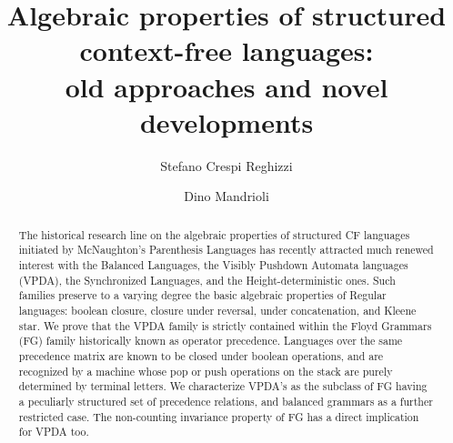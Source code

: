 \documentclass[3p,11pt]{elsarticle}
\begin{document}
\begin{frontmatter}

\title{Algebraic properties of structured context-free languages:\\ old approaches and novel developments}

\author[Milano]{Stefano Crespi Reghizzi}
\author[Milano]{Dino Mandrioli}
\address[Milano]{DEI - Politecnico di Milano, 
Piazza Leonardo da Vinci 32, \\
I-20133 Milano, Italy\\
e-mail: \{stefano.crespireghizzi, dino.mandrioli\}@polimi.it}



\begin{abstract}
The historical research line on the algebraic properties of structured CF languages initiated by McNaughton's Parenthesis Languages has recently attracted much renewed interest with the Balanced Languages, the Visibly Pushdown Automata languages (VPDA), the Synchronized Languages, and the Height-deterministic ones. Such families preserve to a varying degree the basic algebraic properties of Regular languages: boolean closure, closure under reversal, under concatenation, and Kleene star. We prove that the VPDA family is strictly contained within the Floyd Grammars (FG) family historically known as operator precedence. Languages over the same precedence matrix are known to be closed under boolean operations, and are recognized by a machine whose pop or push operations on the stack are purely determined by terminal letters. We characterize VPDA's  as the subclass of FG having a peculiarly structured set of precedence relations, and balanced grammars as a further restricted case.  The non-counting invariance property of FG has a direct implication for VPDA too.
\end{abstract}

\end{frontmatter}
\end{document}
